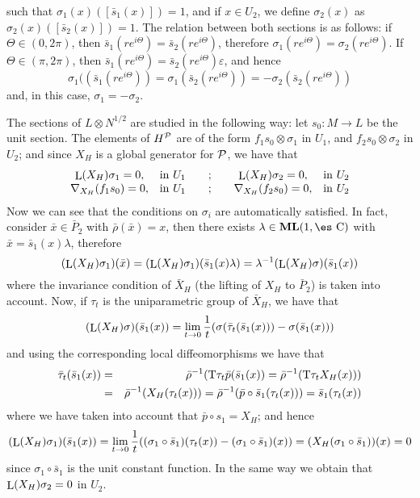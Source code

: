 \documentclass[12pt]{article}
\def\beann{\begin{eqnarray*}}
\def\eeann{\end{eqnarray*}}
\def\Complex{\mbox{\es C}}
\def\Tan{{\rm T}}
\def\Lie{\mathop{\rm L}\nolimits}
\begin{document}
such that $\sigma_1(x)([\bar s_1(x)])=1$, and if $x \in U_2$,
we define $\sigma_2(x)$ as $\sigma_2(x)([\bar s_2(x)])=1$.
The relation between both sections is as follows:
if $\Theta \in (0,2\pi )$, then $\bar s_1(re^{i\Theta}) = \bar
s_2(re^{i\Theta})$, therefore
$\sigma_1(re^{i\Theta}) = \sigma_2(re^{i\Theta})$.
If $\Theta \in (\pi ,2\pi )$, then
$\bar s_1(re^{i\Theta}) = \bar s_2(re^{i\Theta})\varepsilon$, and hence
$$
\sigma_1((\bar s_1(re^{i\Theta})) = \sigma_1(\bar s_2(re^{i\Theta}))
=-\sigma_2(\bar s_2(re^{i\Theta}))
$$
and, in this case, $\sigma_1 = -\sigma_2$.

The sections of $L \otimes N^{1/2}$ are studied in the following way:
let $s_0 \colon M \to L$ be the unit section. The elements of
$H^{\cal P}$ are of the form $f_1 s_0 \otimes \sigma_1$ in $U_1$,
and $f_2 s_0 \otimes \sigma_2$ in $U_2$;
and since $X_H$ is a global generator for ${\cal P}$, we have that
$$
\begin{array}{ccccc}
\Lie (X_H)\sigma_1 = 0 , & {\rm in}\ U_1 &\quad ; \quad &
\Lie (X_H)\sigma_2 = 0, & {\rm in}\ U_2
\\
\nabla_{X_H}(f_1s_0) = 0, & {\rm in}\ U_1 &\quad ; \quad &
\nabla_{X_H}(f_2s_0) = 0, & {\rm in}\ U_2
\end{array}
$$
Now we can see that the conditions on $\sigma_i$ are automatically
satisfied.
In fact, consider $\bar x \in \bar P_2$ with $\bar \rho(\bar x) = x$,
then there exists $\lambda \in {\bf ML}(1,\Complex )$
with $\bar x = \bar s_1(x)\lambda$, therefore
$$
(\Lie(X_H)\sigma_1)(\bar x) =
(\Lie(X_H)\sigma_1)(\bar s_1(x)\lambda ) =
\lambda^{-1}(\Lie(X_H)\sigma )(\bar s_1(x))
$$
where the invariance condition of $\bar X_H$ (the lifting of $X_H$ to
$\bar P_2$)
is taken into account. Now, if $\tau_t$ is the uniparametric group of
$\bar X_H$, we have that
$$
(\Lie(X_H)\sigma )(\bar s_1(x)) =
\lim_{t \to 0}\frac{1}{t}
(\sigma(\bar \tau_t(\bar s_1(x)))-
\sigma(\bar s_1(x)))
$$
and using the corresponding local diffeomorphisms we have that
\beann
\bar \tau_t(\bar s_1(x))
&=&
\bar \rho^{-1}(\Tan \tau_t \bar p(\bar s_1(x))=\bar \rho^{-1}(\Tan
\tau_t X_H(x)))
\\ &=&
\bar \rho^{-1}(X_H(\tau_t(x)))= \bar \rho^{-1}(\bar p \circ \bar
s_1(\tau_t(x))) = \bar s_1(\tau_t(x)) \eeann where we have taken
into account that $\bar p \circ s_1 = X_H$; and hence $$
(\Lie(X_H)\sigma_1)(\bar s_1(x))= \lim_{t \to 0}\frac{1}{t}
((\sigma_1 \circ \bar s_1)(\tau_t(x))-(\sigma_1 \circ \bar
s_1)(x))= (X_H(\sigma_1 \circ \bar s_1))(x) = 0 $$ since $\sigma_1
\circ \bar s_1$ is the unit constant function. In the same way we
obtain that $\Lie(X_H)\sigma_2 = 0$ in $U_2$.
\end{document}
